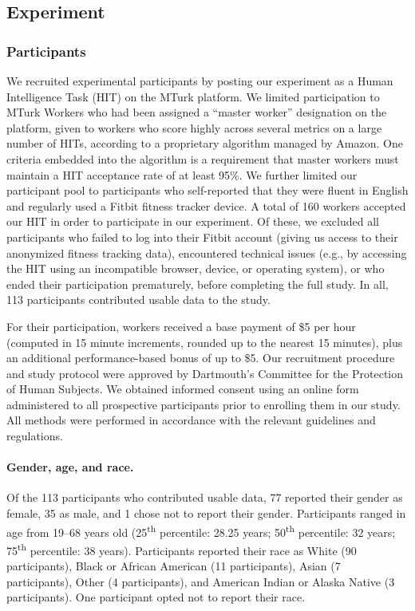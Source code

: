 \documentclass[10pt]{article}
\begin{document}
    
    
\subsection*{Experiment}
\subsubsection*{Participants}
We recruited experimental participants by posting our experiment as a
Human Intelligence Task (HIT) on the MTurk platform.
We limited participation to MTurk Workers who had been
assigned a ``master worker'' designation on the platform, given to workers
who score highly across several metrics on a large number of HITs,
according to a proprietary algorithm managed by Amazon.  One criteria
embedded into the algorithm is a requirement that master
workers must maintain a HIT acceptance rate of at least 95\%.  We further
limited our participant pool to participants who self-reported that
they were fluent in English and regularly used a Fitbit fitness
tracker device.  A total of 160 workers accepted our HIT in order to
participate in our experiment.  Of these, we excluded all participants
who failed to log into their Fitbit account (giving us access to their
anonymized fitness tracking data), encountered technical issues (e.g.,
by accessing the HIT using an incompatible browser, device, or
operating system), or who ended their participation prematurely,
before completing the full study.  In all, 113 participants
contributed usable data to the study.

For their participation, workers received a base payment of \$5 per
hour (computed in 15 minute increments, rounded up to the nearest 15
minutes), plus an additional performance-based bonus of up to \$5.
Our recruitment procedure and study protocol were approved by
Dartmouth's Committee for the Protection of Human Subjects.  We
obtained informed consent using an online form administered to all
prospective participants prior to enrolling them in our study.  All
methods were performed in accordance with the relevant guidelines and
regulations.

\paragraph{Gender, age, and race.}
Of the 113 participants who contributed usable data, 77 reported their gender as female, 35 as
male, and 1 chose not to report their gender.  Participants ranged in
age from 19--68 years old (25\textsuperscript{th} percentile: 28.25
years; 50\textsuperscript{th} percentile: 32 years;
75\textsuperscript{th} percentile: 38 years).  Participants reported
their race as White (90 participants), Black or African American (11
participants), Asian (7 participants), Other (4 participants), and
American Indian or Alaska Native (3 participants).  One participant
opted not to report their race.
\end{document}
